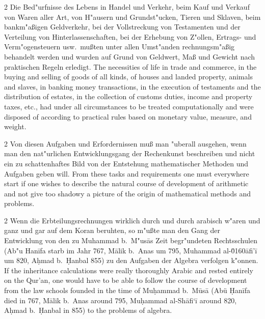 \documentclass[10pt,a4paper]{article}
\renewcommand{\switchcolumn}{\syncronize\nointerlineskip\columnbreak}
\begin{document}
\begin{paracol}{2}
Die Bed"urfnisse des Lebens in Handel und Verkehr, beim Kauf und Verkauf von Waren aller Art, von H"ausern und Grundst"ucken, Tieren und Sklaven, beim bankm"a\ss{}igen Geldverkehr, bei der Vollstreckung von Testamenten und der Verteilung von Hinterlassenschaften, bei der Erhebung von Z"ollen, Ertrags- und Verm"ogensteuern usw.\ mu\ss{}ten unter allen Umst"anden rechnungsm"a\ss{}ig behandelt werden und wurden auf Grund von Geldwert, Ma\ss{} und Gewicht nach praktischen Regeln erledigt.
\switchcolumn
The necessities of life in trade and commerce, in the buying and selling of goods of all kinds, of houses and landed property, animals and slaves, in banking money transactions, in the execution of testaments and the distribution of estates, in the collection of customs duties, income and property taxes, etc., had under all circumstances to be treated computationally and were disposed of according to practical rules based on monetary value, measure, and weight.
\end{paracol}

\begin{paracol}{2}
Von diesen Aufgaben und Erfordernissen mu\ss{} man "uberall ausgehen, wenn man den nat"urlichen Entwicklungsgang der Rechenkunst beschreiben und nicht ein zu schattenhaftes Bild von der Entstehung mathematischer Methoden und Aufgaben geben will.
\switchcolumn
From these tasks and requirements one must everywhere start if one wishes to describe the natural course of development of arithmetic and not give too shadowy a picture of the origin of mathematical methods and problems.
\end{paracol}

\begin{paracol}{2}
Wenn die Erbteilungsrechnungen wirklich durch und durch arabisch w"aren und ganz und gar auf dem Koran beruhten, so m"u\ss{}te man den Gang der Entwicklung von den zu Muhammad b.\ M"us\=as Zeit begr"undeten Rechtsschulen (Ab"u Han\={i}fa starb im Jahr 767, M\=alik b.\ Anas um 795, Muhammad al-\u0160\=afi'\={i} um 820, A\d{h}mad b.\ \d{H}anbal 855) zu den Aufgaben der Algebra verfolgen k"onnen.
\switchcolumn
If the inheritance calculations were really thoroughly Arabic and rested entirely on the Qur'an, one would have to be able to follow the course of development from the law schools founded in the time of Mu\d{h}ammad b.\ M\=us\=a (Ab\"u \d{H}an\={i}fa died in 767, M\=alik b.\ Anas around 795, Mu\d{h}ammad al-Sh\=afi`\={i} around 820, A\d{h}mad b.\ \d{H}anbal in 855) to the problems of algebra.
\end{paracol}
\end{document}
